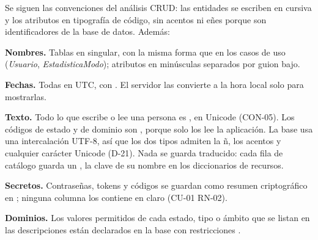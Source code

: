 Se siguen las convenciones del análisis CRUD: las entidades se escriben en cursiva y los atributos en tipografía de código, sin acentos ni eñes porque son identificadores de la base de datos. Además:

\begin{reglas}
  \item \textbf{Nombres.} Tablas en singular, con la misma forma que en los casos de uso (\textit{Usuario}, \textit{EstadisticaModo}); atributos en minúsculas separados por guion bajo.
  \item \textbf{Fechas.} Todas en UTC, con . El servidor las convierte a la hora local solo para mostrarlas.
  \item \textbf{Texto.} Todo lo que escribe o lee una persona es , en Unicode (\mbox{CON-05}). Los códigos de estado y de dominio son , porque solo los lee la aplicación. La base usa una intercalación UTF-8, así que los dos tipos admiten la ñ, los acentos y cualquier carácter Unicode (\mbox{D-21}). Nada se guarda traducido: cada fila de catálogo guarda un , la clave de su nombre en los diccionarios de recursos.
  \item \textbf{Secretos.} Contraseñas, tokens y códigos se guardan como resumen criptográfico en ; ninguna columna los contiene en claro (\mbox{CU-01} \mbox{RN-02}).
  \item \textbf{Dominios.} Los valores permitidos de cada estado, tipo o ámbito que se listan en las descripciones están declarados en la base con restricciones .
\end{reglas}
